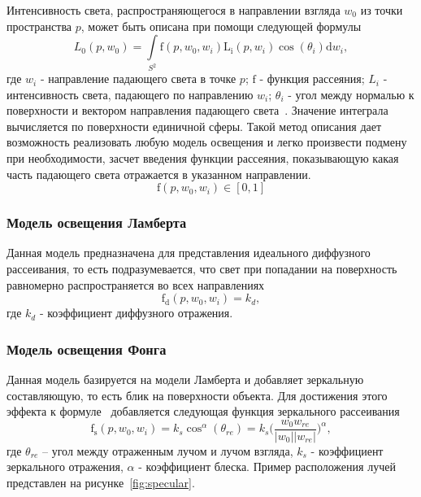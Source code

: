 Интенсивность света, распространяющегося в направлении взгляда $w_0$ из точки
пространства $p$, может быть описана при помощи следующей формулы
\begin{equation} \label{math:base_intensity}
    L_0(p, w_0) = \int\limits_{{S^2}^{}} \mathrm{f}(p, w_0, w_i)
                  \mathrm{L_i}(p, w_i) \cos(\theta_i) \mathrm{d} w_i,
\end{equation}
где $w_i$ - направление падающего света в точке $p$; $\mathrm{f}$ - функция
рассеяния; $L_i$ - интенсивность света, падающего по направлению $w_i$;
$\theta_i$ - угол между нормалью к поверхности и вектором направления падающего
света~\cite{PBRT}. Значение интеграла вычисляется по поверхности единичной сферы.
Такой метод описания дает возможность реализовать любую модель
освещения и легко произвести подмену при необходимости, засчет введения
функции рассеяния, показывающую какая часть падающего света отражается в
указанном направлении.
\begin{equation}
    \mathrm{f}(p, w_0, w_i) \in [0, 1]
\end{equation}

\subsubsection{Модель освещения Ламберта}
Данная модель предназначена для представления идеального диффузного
рассеивания, то есть подразумевается, что свет при попадании на поверхность
равномерно распространяется во всех направлениях
\begin{equation} \label{math:flambert}
    \mathrm{f_d}(p, w_0, w_i) = k_d,
\end{equation}
где $k_d$ - коэффициент диффузного отражения.

\subsubsection{Модель освещения Фонга}
Данная модель базируется на модели Ламберта и добавляет зеркальную
составляющую, то есть блик на поверхности объекта. Для достижения этого
эффекта к формуле~ добавляется следующая функция
зеркального рассеивания
\begin{equation}
    \mathrm{f_s}(p, w_0, w_i) = k_s \cos^\alpha (\theta_{re})
                              = k_s \bigg(\frac{w_0 w_{re}}{{|w_0|}{|w_{re}|}}\bigg)^\alpha,
\end{equation}
где $\theta_{re}$ -- угол между отраженным лучом и лучом взгляда, $k_s$ -
коэффициент зеркального отражения, $\alpha$ - коэффициент блеска. Пример
расположения лучей представлен на рисунке~\ref{fig:specular}.

